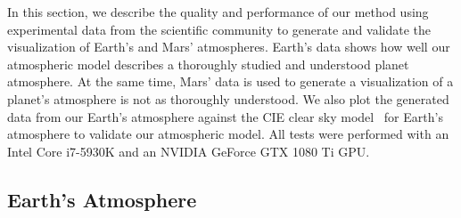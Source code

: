 \documentclass[journal]{vgtc}                %
\newcommand{\review}[1]{{\color{blue}#1}}
\begin{document}
In this section, we describe the quality and performance of our method using experimental data from the scientific community to generate and validate the visualization of Earth's and Mars' atmospheres. 
\review{Earth's data shows how well our atmospheric model describes a thoroughly studied and understood planet atmosphere. At the same time, Mars' data is used to generate a visualization of a planet's atmosphere is not as thoroughly understood.} We also plot the generated data from our Earth's atmosphere against the CIE clear sky model~\cite{Darula:2002} for Earth's atmosphere to validate our atmospheric model. All tests were performed with an Intel Core i7-5930K and an NVIDIA GeForce GTX 1080 Ti GPU.

\vspace*{-1.5mm}
\subsection{Earth's Atmosphere}\label{sec:Earth_ATM}
\end{document}
